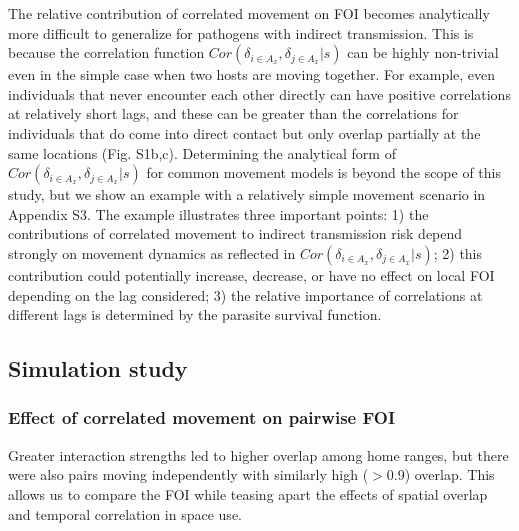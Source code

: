 \documentclass[letterpaper]{article}
\begin{document}
The relative contribution of correlated movement on FOI becomes analytically more difficult to generalize for pathogens with indirect transmission. This is because the correlation function $Cor(\delta_{i \in A_x}, \delta_{j \in A_x} | s)$ can be highly non-trivial even in the simple case when two hosts are moving together. For example, even individuals that never encounter each other directly can have positive correlations at relatively short lags, and these can be greater than the correlations for individuals that do come into direct contact but only overlap partially at the same locations (Fig. S1b,c). Determining the analytical form of $Cor(\delta_{i \in A_x}, \delta_{j \in A_x} | s)$ for common movement models is beyond the scope of this study, but we show an example with a relatively simple movement scenario in Appendix S3. The example illustrates three important points: 1) the contributions of correlated movement to indirect transmission risk depend strongly on movement dynamics as reflected in $Cor(\delta_{i \in A_x}, \delta_{j \in A_x} | s)$; 2) this contribution could potentially increase, decrease, or have no effect on local FOI depending on the lag considered; 3) the relative importance of correlations at different lags is determined by the parasite survival function.

\subsection*{Simulation study}

\subsubsection*{Effect of correlated movement on pairwise FOI}

Greater interaction strengths led to higher overlap among home ranges, but there were also pairs moving independently with similarly high  ($>$0.9) overlap. %
This allows us to compare the FOI while teasing apart the effects of spatial overlap and temporal correlation in space use. 
\end{document}
